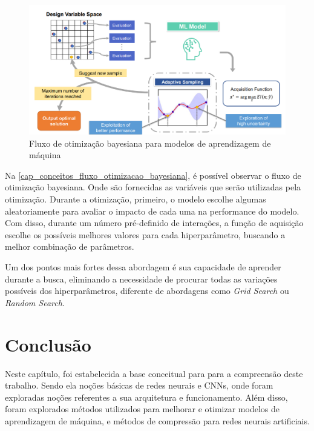 \begin{figure}[htb]
	\begin{center}
		\includegraphics[scale=0.5]{Imagens/fluxo_otmizacao_bayesiana}
	\end{center}
	\caption {\label{cap_conceitos_fluxo_otimizacao_bayesiana}Fluxo de otimização bayesiana para modelos de aprendizagem de máquina}
\end{figure}

Na \autoref{cap_conceitos_fluxo_otimizacao_bayesiana}, é possível observar o fluxo de otimização bayesiana.
Onde são fornecidas as variáveis que serão utilizadas pela otimização.
Durante a otimização, primeiro, o modelo escolhe algumas aleatoriamente para avaliar o impacto de cada uma na
performance do modelo.
Com disso, durante um número pré-definido de interações, a função de aquisição escolhe os possíveis melhores valores
para cada hiperparâmetro, buscando a melhor combinação de parâmetros.

Um dos pontos mais fortes dessa abordagem é sua capacidade de aprender durante a busca, eliminando a necessidade de
procurar todas as variações possíveis dos hiperparâmetros, diferente de abordagens como \textit{Grid Search} ou
\textit{Random Search}.



\section{Conclusão}
Neste capítulo, foi estabelecida a base conceitual para para a compreensão deste trabalho.
Sendo ela noções básicas de redes neurais e CNNs, onde foram exploradas noções referentes a sua arquitetura e funcionamento.
Além disso, foram explorados métodos utilizados para melhorar e otimizar modelos de aprendizagem de máquina, e métodos de
compressão para redes neurais artificiais.
